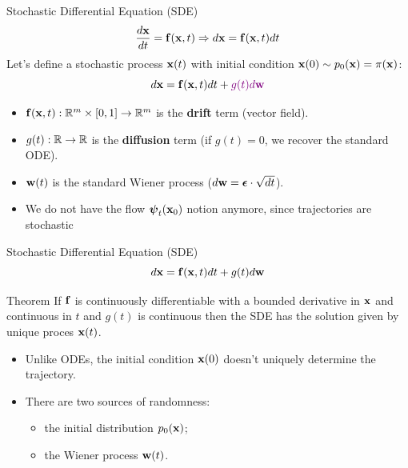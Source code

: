 \documentclass{beamer}
\begin{document}
\begin{frame}{Stochastic Differential Equation (SDE)}
	\[
 		\frac{d \mathbf{x}}{dt} = \mathbf{f}(\mathbf{x}, t) \Rightarrow d\mathbf{x} = \mathbf{f}(\mathbf{x}, t) dt
	\]
	\eqpause
	Let's define a stochastic process $\mathbf{x}(t)$ with initial condition $\mathbf{x}(0) \sim p_0(\mathbf{x}) = \pi(\mathbf{x})$:
	\[
		d\mathbf{x} = \mathbf{f}(\mathbf{x}, t) dt + {\color{violet}g(t) d \mathbf{w}}
	\]
	\eqpause
	\vspace{-0.5cm}
	\begin{itemize}
		 \item $\mathbf{f}(\mathbf{x}, t): \mathbb{R}^m \times [0, 1] \rightarrow \mathbb{R}^m$ is the \textbf{drift} term (vector field).
		 \item $g(t): \mathbb{R} \rightarrow \mathbb{R}$ is the \textbf{diffusion} term (if $g(t)=0$, we recover the standard ODE).
		 \item $\mathbf{w}(t)$ is the standard Wiener process ($d\mathbf{w} = \boldsymbol{\epsilon} \cdot \sqrt{dt}$).
		 \item We do not have the flow $\boldsymbol{\psi}_t(\mathbf{x}_0)$ notion anymore, since trajectories are stochastic
	\end{itemize}
\end{frame}
\begin{frame}{Stochastic Differential Equation (SDE)}
	\[
		d\mathbf{x} = \mathbf{f}(\mathbf{x}, t) dt + g(t) d \mathbf{w}
	\]
	\begin{block}{Theorem}
		If $\mathbf{f}$ is continuously differentiable with a bounded derivative in $\mathbf{x}$ and continuous in $t$ and $g(t)$ is continuous then the SDE has the solution given by unique proces $\mathbf{x}(t)$.
	\end{block}

	\begin{itemize}
		\item Unlike ODEs, the initial condition $\mathbf{x}(0)$ doesn't uniquely determine the trajectory.
		\item There are two sources of randomness: 
		\begin{itemize}
			\item the initial distribution $p_0(\mathbf{x})$;
			\item the Wiener process $\mathbf{w}(t)$.
		\end{itemize}
	\end{itemize}
\end{frame}
\end{document}
